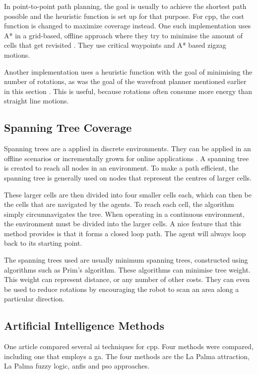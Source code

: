 In point-to-point path planning, the goal is usually to achieve the shortest path possible and the heuristic function is set up for that purpose. For \ac{cpp}, the cost function is changed to maximize coverage instead. One such implementation uses A* in a grid-based, offline approach where they try to minimise the amount of cells that get revisited \cite{Le2018}. They use critical waypoints and A* based zigzag motions. 

Another implementation uses a heuristic function with the goal of minimising the number of rotations, as was the goal of the wavefront planner mentioned earlier in this section \cite{Dogru2017}. This is useful, because rotations often consume more energy than straight line motions.
\subsection{Spanning Tree Coverage}
\label{sec: LR - sSTC}
Spanning trees are a applied in discrete environments. They can be applied in an offline scenarios or incrementally grown for online applications \cite{Gabriely2001}. A spanning tree is created to reach all nodes in an environment. To make a path efficient, the spanning tree is generally used on nodes that represent the centres of larger cells. 

These larger cells are then divided into four smaller cells each, which can then be the cells that are navigated by the agents. To reach each cell, the algorithm simply circumnavigates the tree. When operating in a continuous environment, the environment must be divided into the larger cells. A nice feature that this method provides is that it forms a closed loop path. The agent will always loop back to its starting point. \cite{Hazon2005} 

The spanning trees used are usually minimum spanning trees, constructed using algorithms such as Prim's algorithm. These algorithms can minimise tree weight. This weight can represent distance, or any number of other costs. They can even be used to reduce rotations by encouraging the robot to scan an area along a particular direction. \cite{Gabriely2001}

\subsection{Artificial Intelligence Methods}
\label{sec:LR - sAI}
One article compared several \ac{ai} techniques for \ac{cpp}. Four methods were compared, including one that employs a \ac{ga}. The four methods are the La Palma attraction, La Palma fuzzy logic, \ac{anfis} and \ac{pso} approaches. \cite{Juan2018}

